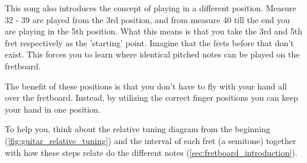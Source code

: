 This song also introduces the concept of playing in a different position. Measure 32 - 39 are played from the 3rd position, and from measure 40 till the end you are playing in the 5th position. What this means is that you take the 3rd and 5th fret respectively as the 'starting' point. Imagine that the frets before that don't exist. This forces you to learn where identical pitched notes can be played on the fretboard.

The benefit of these positions is that you don't have to fly with your hand all over the fretboard. Instead, by utilizing the correct finger positions you can keep your hand in one position.

To help you, think about the relative tuning diagram from the beginning (\autoref{fig:guitar_relative_tuning}) and the interval of each fret (a semitone) together with how these steps relate do the different notes (\autoref{sec:fretboard_introduction}). 



